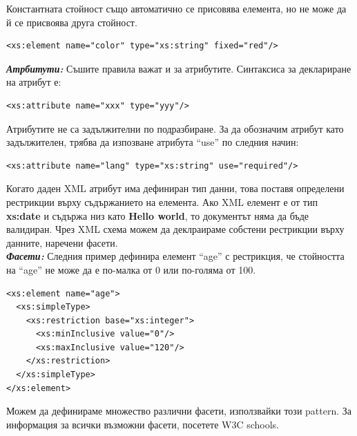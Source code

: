 \documentclass[11pt]{article} %
\begin{document}
Константната стойност също автоматично се присовява елемента, но не може да й се присвоява друга стойност. 
\begin{verbatim}
<xs:element name="color" type="xs:string" fixed="red"/>
\end{verbatim}

\textit{\textbf{Атрбитути: }}Съшите правила важат и за атрибутите. Синтаксиса за деклариране на атрибут е:
\begin{verbatim}
<xs:attribute name="xxx" type="yyy"/>
\end{verbatim}

Атрибутите не са задължителни по подразбиране. За да обозначим атрибут като задължителен, трябва да изпозване атрибута \enquote{use} по следния начин: 

\begin{verbatim}
<xs:attribute name="lang" type="xs:string" use="required"/>
\end{verbatim}

Когато даден XML атрибут има дефиниран тип данни, това поставя определени рестрикции върху съдържанието на елемента.  Ако XML елемент е от тип \textbf{xs:date} и съдържа низ като \textbf{Hello world}, то документът няма да бъде валидиран. Чрез XML схема можем да деклраираме собстени рестрикции върху данните, наречени фасети. \\
\textbf{\textit{Фасети: }} Следния пример дефинира елемент \enquote{age} с рестрикция, че стойността на \enquote{age} не може да е по-малка от 0 или по-голяма от 100.
\begin{verbatim}
<xs:element name="age">
  <xs:simpleType>
    <xs:restriction base="xs:integer">
      <xs:minInclusive value="0"/>
      <xs:maxInclusive value="120"/>
    </xs:restriction>
  </xs:simpleType>
</xs:element>
\end{verbatim}
Можем да дефинираме множество различни фасети, използвайки този pattern. За информация за всички възможни фасети, посетете W3C schools.\\\par
\end{document}
